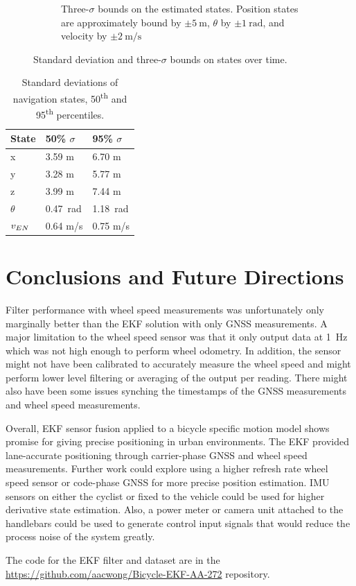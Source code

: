\documentclass[letterpaper,times]{IONconf}
\begin{document}
\begin{figure}
\begin{subfigure}{.47\textwidth}
            \caption{Three-$\sigma$ bounds on the estimated states. Position states are approximately bound by $\pm\SI{5}{\m}$, $\theta$ by $\pm\SI{1}{\radian}$, and velocity by $\pm \SI{2}{\m\per\s}$ }
    \end{subfigure}
    \caption{Standard deviation and three-$\sigma $ bounds on states over time.} \label{fig:std}
\end{figure}

\begin{table}
    \centering
    \begin{tabular}{l|l|l}
        State & 50\% $\sigma$ & 95\% $\sigma$\\
        \hline\hline
        x & 3.59 m & 6.70 m\\
        y & 3.28 m & 5.77 m\\
        z & 3.99 m & 7.44 m\\
        $\theta$ & \SI{0.47}{\radian} & \SI{1.18}{\radian}\\
        $v_{EN}$ & 0.64 m/s & 0.75 m/s\\
    \end{tabular}
    \caption{Standard deviations of navigation states, 50\textsuperscript{th} and 95\textsuperscript{th} percentiles.}\label{tab:std}
\end{table}

\section{Conclusions and Future Directions}

Filter performance with wheel speed measurements was unfortunately only  marginally better than the EKF solution with only GNSS measurements. A major limitation to the wheel speed sensor was that it only output data at \SI{1}{\hertz} which was not high enough to perform wheel odometry. In addition, the sensor might not have been calibrated to accurately measure the wheel speed and might perform lower level filtering or averaging of the output per reading. There might also have been some issues synching the timestamps of the GNSS measurements and wheel speed measurements.

Overall, EKF sensor fusion applied to a bicycle specific motion model shows promise for giving precise positioning in urban environments. The EKF provided lane-accurate positioning through carrier-phase GNSS and wheel speed measurements. Further work could explore using a higher refresh rate wheel speed sensor or code-phase GNSS for more precise position estimation. IMU sensors on either the cyclist or fixed to the vehicle could be used for higher derivative state estimation. Also, a power meter or camera unit attached to the handlebars could be used to generate control input signals that would reduce the process noise of the system greatly. 

The code for the EKF filter and dataset are in the \url{https://github.com/aacwong/Bicycle-EKF-AA-272} repository.


%
\printbibliography{}
\end{document}
